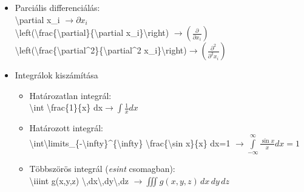 \documentclass[aspectratio=169]{beamer}
\begin{document}
\begin{frame}
\begin{itemize}
\item Parciális differenciálás:\\\textbackslash partial x\_i $\rightarrow\partial x_i$\\\textbackslash left(\textbackslash frac\{\textbackslash partial\}\{\textbackslash partial x\_i\}\textbackslash right) $\rightarrow\left(\frac{\partial}{\partial x_i}\right)$\\ \textbackslash left(\textbackslash frac\{\textbackslash partial\^{}2\}\{\textbackslash partial\^{}2 x\_i\}\textbackslash right)$\rightarrow\left(\frac{\partial^2}{\partial^2 x_i}\right)$\\
\item Integrálok kiszámítása
\begin{itemize}
\item Határozatlan integrál:\\\textbackslash int \textbackslash frac\{1\}\{x\} dx$\rightarrow\int \frac{1}{x} dx$
\item Határozott integrál:\\\textbackslash int\textbackslash limits\_\{-\textbackslash infty\}\^{}\{\textbackslash infty\} \textbackslash frac\{\textbackslash sin x\}\{x\} dx=1 $\rightarrow\int\limits_{-\infty}^{\infty} \frac{\sin x}{x} dx=1$
\item Többszörös integrál (\textit{esint} csomagban):\\\textbackslash iiint g(x,y,z) \textbackslash,dx\textbackslash,dy\textbackslash,dz $\rightarrow\iiint g\left(x,y,z\right) \,dx\,dy\,dz$
\end{itemize}
\end{itemize}
\vfill

\pagebreak %


\end{frame}
\end{document}
